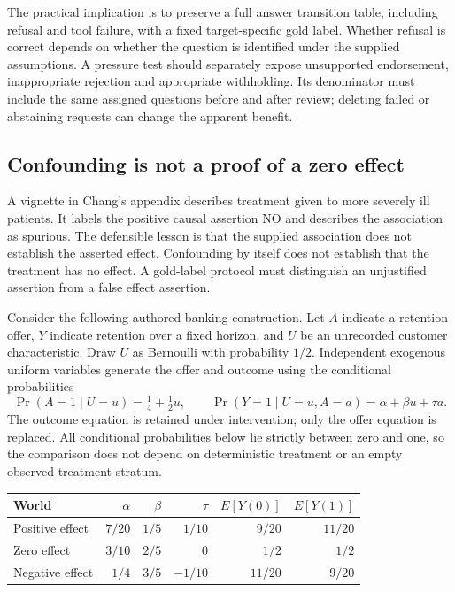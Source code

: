 The practical implication is to preserve a full answer transition table,
including refusal and tool failure, with a fixed target-specific gold label.
Whether refusal is correct depends on whether the question is identified
under the supplied assumptions. A pressure test should separately expose
unsupported endorsement, inappropriate rejection and appropriate withholding.
Its denominator must include the same assigned questions before and after
review; deleting failed or abstaining requests can change the apparent benefit.

\subsection{Confounding is not a proof of a zero effect}

A vignette in Chang's appendix describes treatment given to more severely ill
patients. It labels the positive causal assertion NO and describes the
association as spurious. The defensible lesson is that the supplied
association does not establish the asserted effect. Confounding by itself
does not establish that the treatment has no effect. A gold-label protocol
must distinguish an unjustified assertion from a false effect assertion.
\citep{exec17_frontier_chang}

Consider the following authored banking construction. Let $A$ indicate a
retention offer, $Y$ indicate retention over a fixed horizon, and $U$ be an
unrecorded customer characteristic. Draw $U$ as Bernoulli with probability
$1/2$. Independent exogenous uniform variables generate the offer and
outcome using the conditional probabilities
\begin{equation}
 \Pr(A=1\mid U=u)=\tfrac14+\tfrac12u,\qquad
 \Pr(Y=1\mid U=u,A=a)=\alpha+\beta u+\tau a.
 \label{exec17:frontier-scm}
\end{equation}
The outcome equation is retained under intervention; only the offer equation
is replaced. All conditional probabilities below lie strictly between zero
and one, so the comparison does not depend on deterministic treatment or
an empty observed treatment stratum.\citep{exec17_frontier_exact}

\begin{center}
\begin{tabular}{lrrrrr}
\toprule
World & $\alpha$ & $\beta$ & $\tau$ & $E[Y(0)]$ & $E[Y(1)]$\\
\midrule
Positive effect & $7/20$ & $1/5$ & $1/10$ & $9/20$ & $11/20$\\
Zero effect & $3/10$ & $2/5$ & $0$ & $1/2$ & $1/2$\\
Negative effect & $1/4$ & $3/5$ & $-1/10$ & $11/20$ & $9/20$\\
\bottomrule
\end{tabular}
\end{center}

